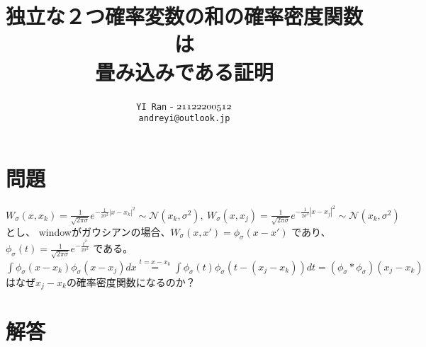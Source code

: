 \documentclass[dvipdfmx,a4paper,12pt]{jarticle}
\title{\vspace{-3cm}\textbf{\Large 独立な２つ確率変数の和の確率密度関数は\\ 畳み込みである証明}}  %
\author{\texttt{YI Ran} - $\mathnormal{21122200512}$\\ \texttt{andreyi@outlook.jp}}  %
\date{}  %
\theoremstyle{mystyle}
\begin{document}
\maketitle
\section*{\textbf{問題}}

\noindent
$W_\sigma(x, x_k) = \frac{1}{\sqrt{2\pi\sigma}} e^{-\frac{1}{2\sigma^2}|x-x_k|^2}\sim \mathcal{N}(x_k,\sigma^2),\ W_\sigma(x, x_j) = \frac{1}{\sqrt{2\pi\sigma}} e^{-\frac{1}{2\sigma^2}|x-x_j|^2}\sim \mathcal{N}(x_k,\sigma^2)$とし、
windowがガウシアンの場合、$W_\sigma(x, x') = \phi_\sigma(x - x')$ であり、$\phi_\sigma(t) = \frac{1}{\sqrt{2\pi\sigma}} e^{-\frac{t^2}{2\sigma^2}}$ である。
$ \displaystyle\int \phi_{\sigma}(x-x_k)\phi_{\sigma}(x-x_j)dx \displaystyle\overset{t=x-x_k}{=}\int \phi_{\sigma}(t)\phi_{\sigma}(t-(x_j-x_k))dt=\displaystyle (\phi_{\sigma}\ast\phi_{\sigma})(x_j-x_k)$はなぜ$x_j-x_k$の確率密度関数になるのか？

\section*{\textbf{解答}}
\end{document}
